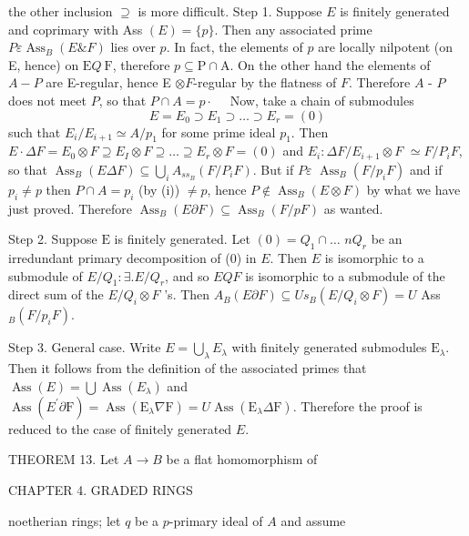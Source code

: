 the other inclusion $\supseteq$ is more difficult. Step 1. Suppose $E$ is finitely generated and coprimary with Ass $(E)=\{p\}$. Then any associated prime $P \varepsilon \operatorname{Ass}_{B}(E \& F)$ lies over $p$. In fact, the elements of $p$ are locally nilpotent (on E, hence) on $\mathrm{E} Q \mathrm{~F}$, therefore $p \subseteq \mathrm{P} \cap \mathrm{A}$. On the other hand the elements of $A-P$ are E-regular, hence E $\otimes F$-regular by the flatness of $F$. Therefore $A$ - $P$ does not meet $P$, so that $P \cap A=p \cdot \quad$ Now, take a chain of submodules
$$
E=E_{0} \supset E_{1} \supset \ldots \supset E_{r}=(0)
$$
such that $E_{i} / E_{i+1} \simeq A / p_{1}$ for some prime ideal $p_{1}$. Then $E \cdot \Delta F=E_{0} \otimes F \supseteq E_{I} \otimes F \supseteq \ldots \supseteq E_{r} \otimes F=(0)$ and $E_{i}: \Delta F / E_{i+1} \otimes F$ $\simeq F / P_{i} F$, so that $\operatorname{Ass}_{B}(E \Delta F) \subseteq \bigcup_{i} A_{s s_{B}}\left(F / P_{i} F\right)$. But if $P \varepsilon$ $\operatorname{Ass}_{B}\left(F / p_{i} F\right)$ and if $p_{i} \neq p$ then $P \cap A=p_{i}$ (by (i)) $\neq p$, hence $P \notin \operatorname{Ass}_{B}(E \otimes F)$ by what we have just proved. Therefore $\operatorname{Ass}_{B}(E \partial F) \subseteq \operatorname{Ass}_{B}(F / p F)$ as wanted.

Step 2. Suppose $\mathrm{E}$ is finitely generated. Let $(0)=Q_{1} \cap \ldots$ $n Q_{r}$ be an irredundant primary decomposition of (0) in $E$. Then $E$ is isomorphic to a submodule of $E / Q_{1}: \exists . E / Q_{r}$, and so $E Q F$ is isomorphic to a submodule of the direct sum of the $E / Q_{i} \otimes F$ 's. Then $A_{B}(E \partial F) \subseteq U s_{B}\left(E / Q_{i} \otimes F\right)=U$ Ass $_{B}\left(F / p_{i} F\right)$.

Step 3. General case. Write $E=\bigcup_{\lambda} E_{\lambda}$ with finitely generated submodules $\mathrm{E}_{\lambda}$. Then it follows from the definition of the associated primes that $\operatorname{Ass}(E)=\bigcup \operatorname{Ass}\left(E_{\lambda}\right)$ and $\operatorname{Ass}\left(E^{\prime} \partial \mathrm{F}\right)=\operatorname{Ass}\left(\mathrm{E}_{\lambda} \nabla \mathrm{F}\right)=U \operatorname{Ass}\left(\mathrm{E}_{\lambda} \Delta \mathrm{F}\right)$. Therefore the proof is reduced to the case of finitely generated $E$.

THEOREM 13. Let $A \rightarrow B$ be a flat homomorphism of

CHAPTER 4. GRADED RINGS

noetherian rings; let $q$ be a $p$-primary ideal of $A$ and assume


